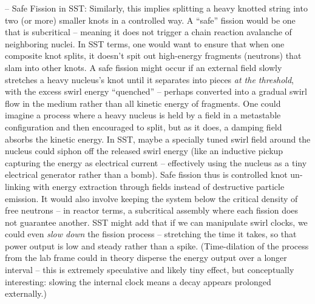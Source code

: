 \documentclass[11pt]{article}
\begin{document}
– Safe Fission in SST: Similarly, this implies splitting a heavy knotted string into two (or more) smaller knots in a controlled way. A “safe” fission would be one that is subcritical – meaning it does not trigger a chain reaction avalanche of neighboring nuclei. In SST terms, one would want to ensure that when one composite knot splits, it doesn’t spit out high-energy fragments (neutrons) that slam into other knots. A safe fission might occur if an external field slowly stretches a heavy nucleus’s knot until it separates into pieces \textit{at the threshold}, with the excess swirl energy “quenched” – perhaps converted into a gradual swirl flow in the medium rather than all kinetic energy of fragments. One could imagine a process where a heavy nucleus is held by a field in a metastable configuration and then encouraged to split, but as it does, a damping field absorbs the kinetic energy. In SST, maybe a specially tuned swirl field around the nucleus could siphon off the released swirl energy (like an inductive pickup capturing the energy as electrical current – effectively using the nucleus as a tiny electrical generator rather than a bomb). Safe fission thus is controlled knot un-linking with energy extraction through fields instead of destructive particle emission. It would also involve keeping the system below the critical density of free neutrons – in reactor terms, a subcritical assembly where each fission does not guarantee another. SST might add that if we can manipulate swirl clocks, we could even \textit{slow down} the fission process – stretching the time it takes, so that power output is low and steady rather than a spike. (Time-dilation of the process from the lab frame could in theory disperse the energy output over a longer interval – this is extremely speculative and likely tiny effect, but conceptually interesting: slowing the internal clock means a decay appears prolonged externally.)
\end{document}

